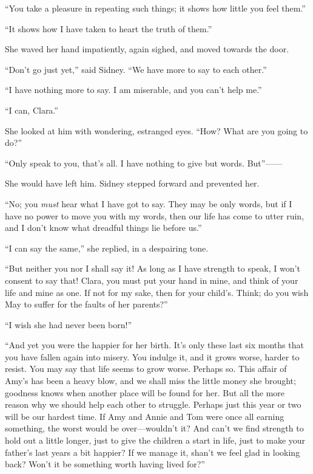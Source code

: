 ``You take a pleasure in repeating such things; it shows how little you
feel them.''

``It shows how I have taken to heart the truth of them.''

She waved her hand impatiently, again sighed, and moved towards the
door.

``Don't go just yet,'' said Sidney. ``We have more to say to each
other.''

``I have nothing more to say. I am miserable, and you can't help me.''

``I can, Clara.''

She looked at him with wondering, estranged eyes. ``How? What are you
going to do?''

``Only speak to you, that's all. I have nothing to give but words.
But''{{------}}

{}She would have left him. Sidney stepped forward and prevented her.

``No; you \emph{must} hear what I have got to say. They may be only
words, but if I have no power to move you with my words, then our life
has come to utter ruin, and I don't know what dreadful things lie before
us.''

``I can say the same,'' she replied, in a despairing tone.

``But neither you nor I shall say it! As long as I have strength to
speak, I won't consent to say that! Clara, you must put your hand in
mine, and think of your life and mine as one. If not for my sake, then
for your child's. Think; do you wish May to suffer for the faults of her
parents?''

``I wish she had never been born!''

``And yet you were the happier for her birth. It's only these last six
months that you have fallen again into misery. You indulge it, and it
grows worse, harder to resist. You may say that life seems to grow
worse. Perhaps so. This affair of Amy's has been a heavy blow, and we
shall miss the little money she brought; goodness knows when another
place will be found for her. But all the more {}reason why we should
help each other to struggle. Perhaps just this year or two will be our
hardest time. If Amy and Annie and Tom were once all earning something,
the worst would be over---wouldn't it? And can't we find strength to
hold out a little longer, just to give the children a start in life,
just to make your father's last years a bit happier? If we manage it,
shan't we feel glad in looking back? Won't it be something worth having
lived for?''


